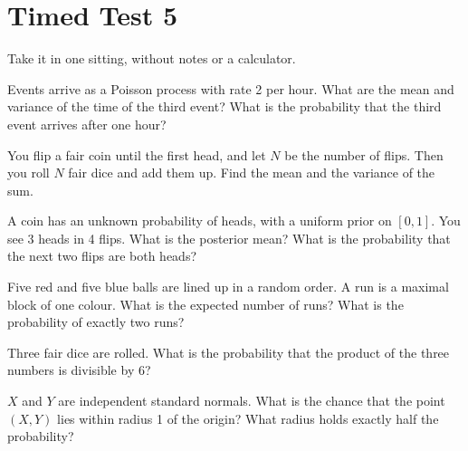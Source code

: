 \chapter{Timed Test 5}\label{ch:iv1:timed-test-5}

\begin{ivtrains}
Take it in one sitting, without notes or a calculator.
\end{ivtrains}


\begin{question}\label{iq:iv1:timed-test-5:1}
Events arrive as a Poisson process with rate 2 per hour. What are the mean and variance of the time of the third event? What is the probability that the third event arrives after one hour?
\end{question}

\begin{question}\label{iq:iv1:timed-test-5:2}
You flip a fair coin until the first head, and let $N$ be the number of flips. Then you roll $N$ fair dice and add them up. Find the mean and the variance of the sum.
\end{question}

\begin{question}\label{iq:iv1:timed-test-5:3}
A coin has an unknown probability of heads, with a uniform prior on $[0, 1]$. You see 3 heads in 4 flips. What is the posterior mean? What is the probability that the next two flips are both heads?
\end{question}

\begin{question}\label{iq:iv1:timed-test-5:4}
Five red and five blue balls are lined up in a random order. A run is a maximal block of one colour. What is the expected number of runs? What is the probability of exactly two runs?
\end{question}

\begin{question}\label{iq:iv1:timed-test-5:5}
Three fair dice are rolled. What is the probability that the product of the three numbers is divisible by 6?
\end{question}

\begin{question}\label{iq:iv1:timed-test-5:6}
$X$ and $Y$ are independent standard normals. What is the chance that the point $(X, Y)$ lies within radius 1 of the origin? What radius holds exactly half the probability?
\end{question}

